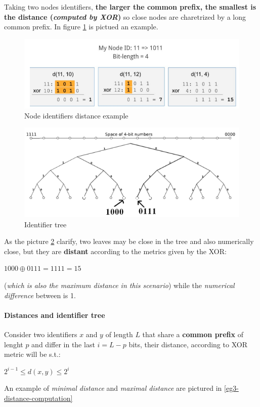 \documentclass[10pt,a4paper]{report}
\begin{document}
Taking two nodes identifiers, \textbf{the larger the common prefix, the smallest is the distance (\textit{computed by XOR})} so close nodes are charetrized by a long common prefix. In figure \ref{eg-distance} is pictued an example.
\begin{figure}
	\centering
	\includegraphics[scale=0.60]{images/Pasted image 20230303145655.png}
	\caption{Node identifiers distance example}
\label{eg-distance}
\end{figure}

\begin{figure}
	\centering
	\includegraphics[scale=0.60]{images/Pasted image 20230303145932.png}
	\caption{Identifier tree}
\label{eg2-identifier-tree}
\end{figure}

As the picture \ref{eg2-identifier-tree} clarify, two leaves may be close in the tree and also numerically close, but they are \textbf{distant} according to the metrics given by the XOR:
\begin{center}
	$1000 \oplus 0111 = 1111 = 15$
\end{center}

(\textit{which is also the maximum distance in this scenario}) while the \textit{numerical difference} between is 1.
\paragraph{Distances and identifier tree}\label{sec:distances-and-identifier-tree}
Consider two identifiers $x$ and $y$ of length $L$ that share a \textbf{common prefix} of lenght $p$ and differ in the last $i = L - p$ bits, their distance, according to XOR metric will be s.t.:
\begin{center}
$2^{i-1} \leq d(x,y) \le 2^{i}$
\end{center}
An example of \textit{minimal distance} and \textit{maximal distance} are pictured in \ref{eg3-distance-computation}
\end{document}

